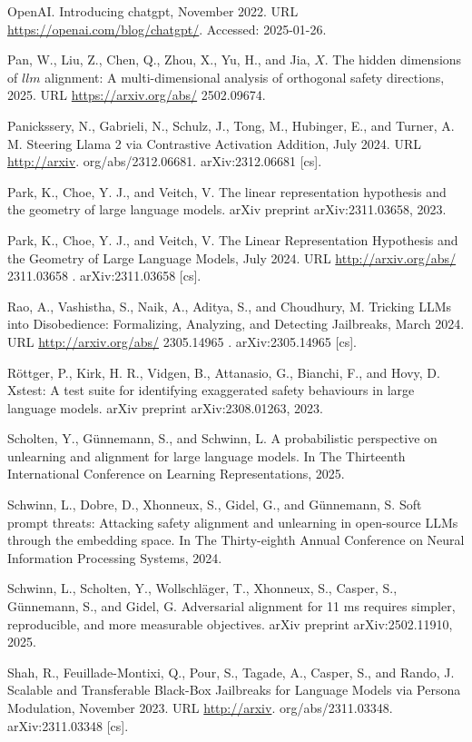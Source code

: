 \documentclass[10pt]{article}
\begin{document}
OpenAI. Introducing chatgpt, November 2022. URL \href{https://openai.com/blog/chatgpt/}{https://openai.com/blog/chatgpt/}. Accessed: 2025-01-26.

Pan, W., Liu, Z., Chen, Q., Zhou, X., Yu, H., and Jia, $X$. The hidden dimensions of $l l m$ alignment: A multi-dimensional analysis of orthogonal safety directions, 2025. URL \href{https://arxiv.org/abs/}{https://arxiv.org/abs/} 2502.09674.

Panickssery, N., Gabrieli, N., Schulz, J., Tong, M., Hubinger, E., and Turner, A. M. Steering Llama 2 via Contrastive Activation Addition, July 2024. URL \href{http://arxiv}{http://arxiv}. org/abs/2312.06681. arXiv:2312.06681 [cs].

Park, K., Choe, Y. J., and Veitch, V. The linear representation hypothesis and the geometry of large language models. arXiv preprint arXiv:2311.03658, 2023.

Park, K., Choe, Y. J., and Veitch, V. The Linear Representation Hypothesis and the Geometry of Large Language Models, July 2024. URL \href{http://arxiv.org/abs/}{http://arxiv.org/abs/} 2311.03658 . arXiv:2311.03658 [cs].

Rao, A., Vashistha, S., Naik, A., Aditya, S., and Choudhury, M. Tricking LLMs into Disobedience: Formalizing, Analyzing, and Detecting Jailbreaks, March 2024. URL \href{http://arxiv.org/abs/}{http://arxiv.org/abs/} 2305.14965 . arXiv:2305.14965 [cs].

Röttger, P., Kirk, H. R., Vidgen, B., Attanasio, G., Bianchi, F., and Hovy, D. Xstest: A test suite for identifying exaggerated safety behaviours in large language models. arXiv preprint arXiv:2308.01263, 2023.

Scholten, Y., Günnemann, S., and Schwinn, L. A probabilistic perspective on unlearning and alignment for large language models. In The Thirteenth International Conference on Learning Representations, 2025.

Schwinn, L., Dobre, D., Xhonneux, S., Gidel, G., and Günnemann, S. Soft prompt threats: Attacking safety alignment and unlearning in open-source LLMs through the embedding space. In The Thirty-eighth Annual Conference on Neural Information Processing Systems, 2024.

Schwinn, L., Scholten, Y., Wollschläger, T., Xhonneux, S., Casper, S., Günnemann, S., and Gidel, G. Adversarial alignment for 11 ms requires simpler, reproducible, and more measurable objectives. arXiv preprint arXiv:2502.11910, 2025.

Shah, R., Feuillade-Montixi, Q., Pour, S., Tagade, A., Casper, S., and Rando, J. Scalable and Transferable Black-Box Jailbreaks for Language Models via Persona Modulation, November 2023. URL \href{http://arxiv}{http://arxiv}. org/abs/2311.03348. arXiv:2311.03348 [cs].
\end{document}
